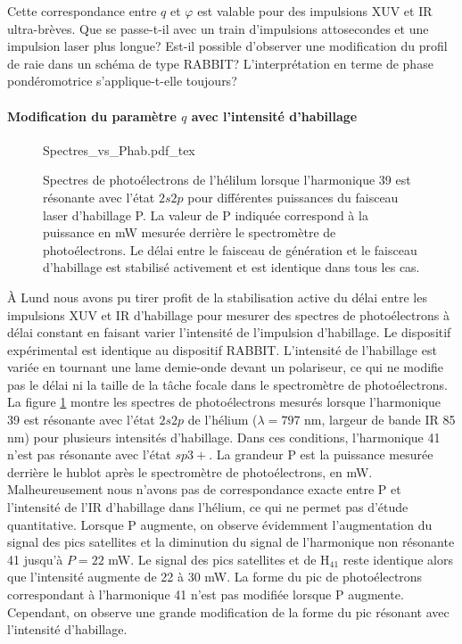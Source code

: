 Cette correspondance entre $q$ et $\varphi$ est valable pour des impulsions XUV et IR ultra-brèves. Que se passe-t-il avec un train d'impulsions attosecondes et une impulsion laser plus longue? Est-il possible d'observer une modification du profil de raie dans un schéma de type RABBIT? L'interprétation en terme de phase pondéromotrice s'applique-t-elle toujours?

\paragraph*{Modification du paramètre $q$ avec l'intensité d'habillage}
\begin{figure}[ht]
\centering
\def\svgwidth{\textwidth}
{Spectres_vs_Phab.pdf_tex}
\caption{Spectres de photoélectrons de l'hélilum lorsque l'harmonique 39 est résonante avec l'état $2s2p$ pour différentes puissances du faisceau laser d'habillage P. La valeur de P indiquée correspond à la puissance en mW mesurée derrière le spectromètre de photoélectrons. Le délai entre le faisceau de génération et le faisceau d'habillage est stabilisé activement et est identique dans tous les cas.}
\label{fig:Spectres_vs_Phab}
\end{figure}

\`{A} Lund nous avons pu tirer profit de la stabilisation active du délai entre les impulsions XUV et IR d'habillage pour mesurer des spectres de photoélectrons à délai constant en faisant varier l'intensité de l'impulsion d'habillage. Le dispositif expérimental est identique au dispositif RABBIT. L'intensité de l'habillage est variée en tournant une lame demie-onde devant un polariseur, ce qui ne modifie pas le délai ni la taille de la tâche focale dans le spectromètre de photoélectrons. La figure \ref{fig:Spectres_vs_Phab} montre les spectres de photoélectrons mesurés lorsque l'harmonique 39 est résonante avec l'état $2s2p$ de l'hélium ($\lambda = 797$ nm, largeur de bande IR 85 nm) pour plusieurs intensités d'habillage. Dans ces conditions, l'harmonique 41 n'est pas résonante avec l'état $sp3+$. La grandeur P est la puissance mesurée derrière le hublot après le spectromètre de photoélectrons, en mW. Malheureusement nous n'avons pas de correspondance exacte entre P et l'intensité de l'IR d'habillage dans l'hélium, ce qui ne permet pas d'étude quantitative. Lorsque P augmente, on observe évidemment l'augmentation du signal des pics satellites et la diminution du signal de l'harmonique non résonante 41 jusqu'à $P = 22$ mW. Le signal des pics satellites et de H$_{41}$ reste identique alors que l'intensité augmente de 22 à 30 mW. La forme du pic de photoélectrons correspondant à l'harmonique 41 n'est pas modifiée lorsque P augmente. Cependant, on observe une grande modification de la forme du pic résonant avec l'intensité d'habillage. 

